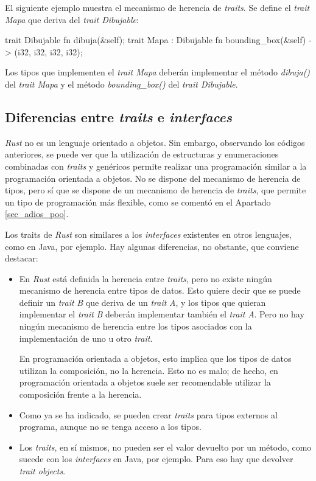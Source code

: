 El siguiente ejemplo muestra el mecanismo de herencia de \textit{traits}. Se define el \textit{trait Mapa} que deriva del \textit{trait Dibujable}:

\begin{Codigo}
trait Dibujable {
   fn dibuja(&self);
}
trait Mapa : Dibujable {
   fn bounding_box(&self) -> (i32, i32, i32, i32);
}
\end{Codigo}

Los tipos que implementen el \textit{trait Mapa} deberán implementar el método \textit{dibuja()} del \textit{trait Mapa} y el método \textit{bounding\_box()} del \textit{trait Dibujable}.

\subsection{Diferencias entre \textit{traits} e \textit{interfaces}}
\noindent \textit{Rust} no es un lenguaje orientado a objetos. Sin embargo, observando los códigos anteriores, se puede ver que la utilización de estructuras y enumeraciones combinadas con \textit{traits} y genéricos permite realizar una programación similar a la programación orientada a objetos. No se dispone del mecanismo de herencia de tipos, pero sí que se dispone de un mecanismo de herencia de \textit{traits}, que permite un tipo de programación más flexible, como se comentó en el Apartado \ref{sec_adios_poo}.

Los traits de \textit{Rust} son similares a los \textit{interfaces} existentes en otros lenguajes, como en Java, por ejemplo. Hay algunas diferencias, no obstante, que conviene destacar:
\begin{itemize}
   \item En \textit{Rust} está definida la herencia entre \textit{traits}, pero no
   existe ningún mecanismo de herencia entre tipos de datos. Esto quiere decir que
   se puede definir un \textit{trait} \textit{B} que deriva de un \textit{trait}
   \textit{A}, y los tipos que quieran implementar el \textit{trait} \textit{B} deberán implementar también el \textit{trait} \textit{A}. Pero no hay ningún mecanismo de herencia entre los tipos asociados con la implementación de uno u otro \textit{trait}. 
   
   En programación orientada a objetos, esto implica que los tipos de datos
   utilizan la composición, no la herencia. Esto no es malo; de hecho, en programación orientada a objetos suele ser recomendable utilizar la composición frente a la herencia.
   
   \item Como ya se ha indicado, se pueden crear \textit{traits} para tipos externos al programa, aunque no se tenga acceso a los tipos.
   
   \item Los \textit{traits}, en sí mismos, no pueden ser el valor devuelto por un
   método, como sucede con los \textit{interfaces} en Java, por ejemplo. Para eso hay que devolver \textit{trait objects}.
\end{itemize}

